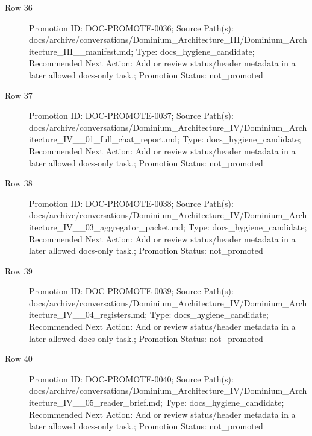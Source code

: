 \documentclass[9pt,a4paper,openany]{book}
\begin{document}
\begin{description}
\item[Row 36] Promotion ID: DOC-\allowbreak{}PROMOTE-\allowbreak{}0036; Source Path(s): docs/\allowbreak{}archive/\allowbreak{}conversations/\allowbreak{}Dominium\_\allowbreak{}Architecture\_\allowbreak{}III/\allowbreak{}Dominium\_\allowbreak{}Architecture\_\allowbreak{}III\_\allowbreak{}\_\allowbreak{}manifest.\allowbreak{}md; Type: docs\_\allowbreak{}hygiene\_\allowbreak{}candidate; Recommended Next Action: Add or review status/\allowbreak{}header metadata in a later allowed docs-\allowbreak{}only task.\allowbreak{}; Promotion Status: not\_\allowbreak{}promoted
\item[Row 37] Promotion ID: DOC-\allowbreak{}PROMOTE-\allowbreak{}0037; Source Path(s): docs/\allowbreak{}archive/\allowbreak{}conversations/\allowbreak{}Dominium\_\allowbreak{}Architecture\_\allowbreak{}IV/\allowbreak{}Dominium\_\allowbreak{}Architecture\_\allowbreak{}IV\_\allowbreak{}\_\allowbreak{}01\_\allowbreak{}full\_\allowbreak{}chat\_\allowbreak{}report.\allowbreak{}md; Type: docs\_\allowbreak{}hygiene\_\allowbreak{}candidate; Recommended Next Action: Add or review status/\allowbreak{}header metadata in a later allowed docs-\allowbreak{}only task.\allowbreak{}; Promotion Status: not\_\allowbreak{}promoted
\item[Row 38] Promotion ID: DOC-\allowbreak{}PROMOTE-\allowbreak{}0038; Source Path(s): docs/\allowbreak{}archive/\allowbreak{}conversations/\allowbreak{}Dominium\_\allowbreak{}Architecture\_\allowbreak{}IV/\allowbreak{}Dominium\_\allowbreak{}Architecture\_\allowbreak{}IV\_\allowbreak{}\_\allowbreak{}03\_\allowbreak{}aggregator\_\allowbreak{}packet.\allowbreak{}md; Type: docs\_\allowbreak{}hygiene\_\allowbreak{}candidate; Recommended Next Action: Add or review status/\allowbreak{}header metadata in a later allowed docs-\allowbreak{}only task.\allowbreak{}; Promotion Status: not\_\allowbreak{}promoted
\item[Row 39] Promotion ID: DOC-\allowbreak{}PROMOTE-\allowbreak{}0039; Source Path(s): docs/\allowbreak{}archive/\allowbreak{}conversations/\allowbreak{}Dominium\_\allowbreak{}Architecture\_\allowbreak{}IV/\allowbreak{}Dominium\_\allowbreak{}Architecture\_\allowbreak{}IV\_\allowbreak{}\_\allowbreak{}04\_\allowbreak{}registers.\allowbreak{}md; Type: docs\_\allowbreak{}hygiene\_\allowbreak{}candidate; Recommended Next Action: Add or review status/\allowbreak{}header metadata in a later allowed docs-\allowbreak{}only task.\allowbreak{}; Promotion Status: not\_\allowbreak{}promoted
\item[Row 40] Promotion ID: DOC-\allowbreak{}PROMOTE-\allowbreak{}0040; Source Path(s): docs/\allowbreak{}archive/\allowbreak{}conversations/\allowbreak{}Dominium\_\allowbreak{}Architecture\_\allowbreak{}IV/\allowbreak{}Dominium\_\allowbreak{}Architecture\_\allowbreak{}IV\_\allowbreak{}\_\allowbreak{}05\_\allowbreak{}reader\_\allowbreak{}brief.\allowbreak{}md; Type: docs\_\allowbreak{}hygiene\_\allowbreak{}candidate; Recommended Next Action: Add or review status/\allowbreak{}header metadata in a later allowed docs-\allowbreak{}only task.\allowbreak{}; Promotion Status: not\_\allowbreak{}promoted

\end{description}
\end{document}
